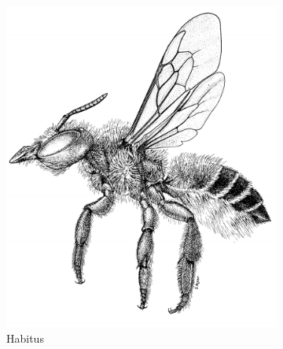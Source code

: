 \documentclass[letterpaper, 11pt]{article}
\begin{document}
\begin{figure}[ht!]
    \centering
     \begin{subfigure}[ht!]{0.42\textwidth}
        \includegraphics[width=\textwidth]{MegachilidHabitus}
        \caption{Habitus \citep[][Fig. 116]{goulet1993hymenoptera}}
        \label{fig:megachilid1}
    \end{subfigure}
   \qquad
    \begin{subfigure}[ht!]{0.32\textwidth}

\end{subfigure}
\end{figure}
\end{document}
